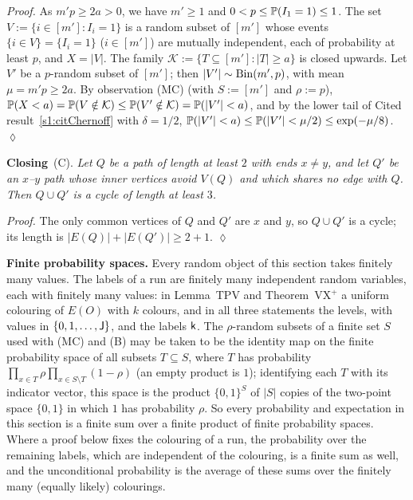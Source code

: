 \emph{Proof.} As $m'p\ge2a>0$, we have $m'\ge1$ and $0<p\le\mathbb{P}(I_1=1)\le1$. The set $V:=\{i\in[m']:I_i=1\}$ is a
random subset of $[m']$ whose events $\{i\in V\}=\{I_i=1\}$ \textup{(}$i\in[m']$\textup{)} are mutually independent,
each of probability at least $p$, and $X=|V|$. The family $\mathcal K:=\{T\subseteq[m']:|T|\ge a\}$ is closed upwards.
Let $V'$ be a $p$-random subset of $[m']$; then $|V'|\sim\mathrm{Bin}(m',p)$, with mean $\mu=m'p\ge2a$. By observation
\textup{(MC)} (with $S:=[m']$ and $\rho:=p$), $\mathbb{P}(X<a)=\mathbb{P}(V\notin\mathcal K)\le\mathbb{P}(V'\notin\mathcal
K)=\mathbb{P}(|V'|<a)$, and by the lower tail of Cited result~\ref{s1:citChernoff} with $\delta=1/2$,
$\mathbb{P}(|V'|<a)\le\mathbb{P}(|V'|<\mu/2)\le\exp(-\mu/8)$. \hfill$\lozenge$

\smallskip\noindent\textbf{Closing}~\textup{(C)}.
\emph{Let $Q$ be a path of length at least $2$ with ends $x\ne y$, and let $Q'$ be an $x$--$y$ path whose inner
vertices avoid $V(Q)$ and which shares no edge with $Q$. Then $Q\cup Q'$ is a cycle of length at least $3$.}

\emph{Proof.} The only common vertices of $Q$ and $Q'$ are $x$ and $y$, so $Q\cup Q'$ is a cycle; its length is
$|E(Q)|+|E(Q')|\ge2+1$. \hfill$\lozenge$

\smallskip\noindent\textbf{Finite probability spaces.} Every random object of this section takes finitely many
values. The labels of a run are finitely many independent random variables, each with finitely many values: in
Lemma~TPV and Theorem~VX$^+$ a uniform colouring of $E(O)$ with $k$ colours, and in all three statements the levels,
with values in $\{0,1,\dots,\mathsf{J}\}$, and the labels $\mathsf{k}$. The $\rho$-random subsets of a finite set $S$ used with
\textup{(MC)} and \textup{(B)} may be taken to be the identity map on the finite probability space of all subsets
$T\subseteq S$, where $T$ has probability $\prod_{x\in T}\rho\prod_{x\in S\setminus T}(1-\rho)$ (an empty product is
$1$); identifying each $T$ with its indicator vector, this space is the product $\{0,1\}^S$ of $|S|$ copies of the
two-point space $\{0,1\}$ in which $1$ has probability $\rho$. So every probability and expectation in this section is
a finite sum over a finite product of finite probability spaces. Where a proof below fixes the colouring of a run,
the probability over the remaining labels, which are independent of the colouring, is a finite sum as well, and the
unconditional probability is the average of these sums over the finitely many (equally likely) colourings.

